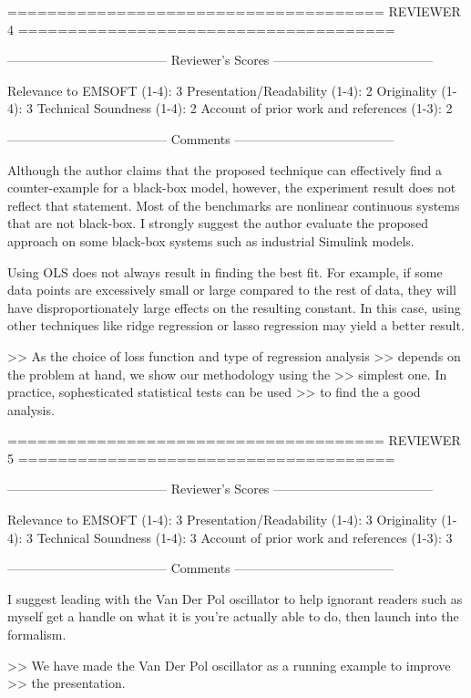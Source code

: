 ======================================
                            REVIEWER 4
======================================


--------------------------------------
Reviewer's Scores
--------------------------------------

               Relevance to EMSOFT (1-4): 3
          Presentation/Readability (1-4): 2
                       Originality (1-4): 3
               Technical Soundness (1-4): 2
Account of prior work and references (1-3): 2


--------------------------------------
Comments
--------------------------------------

Although the author claims that the proposed technique can effectively find a
counter-example for a black-box model, however, the experiment result does not
reflect that statement. Most of the benchmarks are nonlinear continuous systems
that are not black-box. I strongly suggest the author evaluate the proposed
approach on some black-box systems such as industrial Simulink models.

Using OLS does not always result in finding the best fit. For example, if some
data points are excessively small or large compared to the rest of data, they
will have disproportionately large effects on the resulting constant. In this
case, using other techniques like ridge regression or lasso regression may
yield a better result.

>> As the choice of loss function and type of regression analysis
>> depends on the problem at hand, we show our methodology using the
>> simplest one. In practice, sophesticated statistical tests can be used
>> to find the a good analysis.


======================================
                            REVIEWER 5
======================================


--------------------------------------
Reviewer's Scores
--------------------------------------

               Relevance to EMSOFT (1-4): 3
          Presentation/Readability (1-4): 3
                       Originality (1-4): 3
               Technical Soundness (1-4): 3
Account of prior work and references (1-3): 3


--------------------------------------
Comments
--------------------------------------

I suggest leading with the Van Der Pol oscillator to help ignorant
readers such as myself get a handle on what it is you're actually able
to do, then launch into the formalism.

>> We have made the Van Der Pol oscillator as a running example to improve
>> the presentation.
